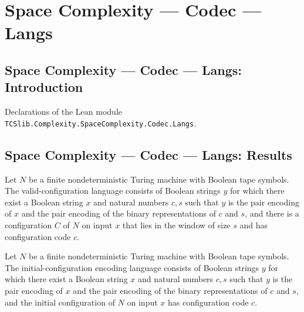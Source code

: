 \section{Space Complexity --- Codec --- Langs}
\subsection*{Space Complexity --- Codec --- Langs: Introduction}

Declarations of the Lean module \texttt{TCSlib.Complexity.SpaceComplexity.Codec.Langs}.

\subsection*{Space Complexity --- Codec --- Langs: Results}

\begin{definition}
\label{Complexity.Codec.validLang}
\leanok
{}
Let $N$ be a finite nondeterministic Turing machine with Boolean tape symbols. The
valid-configuration language consists of Boolean strings $y$ for which there exist a
Boolean string $x$ and natural numbers $c,s$ such that $y$ is the pair encoding of $x$
and the pair encoding of the binary representations of $c$ and $s$, and there is a
configuration $C$ of $N$ on input $x$ that lies in the window of size $s$ and has
configuration code $c$.
\end{definition}

\begin{definition}
\label{Complexity.Codec.initLang}
\leanok
{}
Let $N$ be a finite nondeterministic Turing machine with Boolean tape symbols. The
initial-configuration encoding language consists of Boolean strings $y$ for which there
exist a Boolean string $x$ and natural numbers $c,s$ such that $y$ is the pair encoding
of $x$ and the pair encoding of the binary representations of $c$ and $s$, and the
initial configuration of $N$ on input $x$ has configuration code $c$.
\end{definition}

